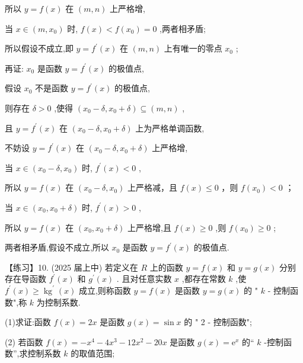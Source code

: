 \documentclass[10pt]{article}
\begin{document}
所以 \(y = f\left( x\right)\) 在 \(\left( {m,n}\right)\) 上严格增,

当 \(x \in  \left( {m,{x}_{0}}\right)\) 时, \(f\left( x\right)  < f\left( {x}_{0}\right)  = 0\) ,两者相矛盾;

所以假设不成立,即 \(y = {f}^{\prime }\left( x\right)\) 在 \(\left( {m,n}\right)\) 上有唯一的零点 \({x}_{0}\) ;

再证: \({x}_{0}\) 是函数 \(y = {f}^{\prime }\left( x\right)\) 的极值点,

假设 \({x}_{0}\) 不是函数 \(y = {f}^{\prime }\left( x\right)\) 的极值点,

则存在 \(\delta  > 0\) ,使得 \(\left( {{x}_{0} - \delta ,{x}_{0} + \delta }\right)  \subseteq  \left( {m,n}\right)\) ,

且 \(y = {f}^{\prime }\left( x\right)\) 在 \(\left( {{x}_{0} - \delta ,{x}_{0} + \delta }\right)\) 上为严格单调函数,

不妨设 \(y = {f}^{\prime }\left( x\right)\) 在 \(\left( {{x}_{0} - \delta ,{x}_{0} + \delta }\right)\) 上严格增,

当 \(x \in  \left( {{x}_{0} - \delta ,{x}_{0}}\right)\) 时, \({f}^{\prime }\left( x\right)  < 0\) ,

所以 \(y = f\left( x\right)\) 在 \(\left( {{x}_{0} - \delta ,{x}_{0}}\right)\) 上严格减，且 \(f\left( x\right)  \leq  0\) ，则 \(f\left( {x}_{0}\right)  < 0\) ；

当 \(x \in  \left( {{x}_{0},{x}_{0} + \delta }\right)\) 时, \({f}^{\prime }\left( x\right)  > 0\) ,

所以 \(y = f\left( x\right)\) 在 \(\left( {{x}_{0},{x}_{0} + \delta }\right)\) 上严格增,且 \(f\left( x\right)  \geq  0\) ,则 \(f\left( {x}_{0}\right)  \geq  0\) ;

两者相矛盾,假设不成立,所以 \({x}_{0}\) 是函数 \(y = {f}^{\prime }\left( x\right)\) 的极值点.

【练习】10. (2025 届上中) 若定义在 \(R\) 上的函数 \(y = f\left( x\right)\) 和 \(y = g\left( x\right)\) 分别存在导函数 \({f}^{\prime }\left( x\right)\) 和 \({g}^{\prime }\left( x\right)\) . 且对任意实数 \(x\) ,都存在常数 \(k\) ,使 \({f}^{\prime }\left( x\right)  \geq  {\operatorname{kg}}^{\prime }\left( x\right)\) 成立,则称函数 \(y = f\left( x\right)\) 是函数 \(y = g\left( x\right)\) 的 " \(k\) - 控制函数",称 \(k\) 为控制系数.

(1)求证:函数 \(f\left( x\right)  = {2x}\) 是函数 \(g\left( x\right)  = \sin x\) 的 " 2 - 控制函数";

(2) 若函数 \(f\left( x\right)  =  - {x}^{4} - 4{x}^{3} - {12}{x}^{2} - {20x}\) 是函数 \(g\left( x\right)  = {\mathrm{e}}^{x}\) 的“ \(k\) -控制函数”,求控制系数 \(k\) 的取值范围;
\end{document}
